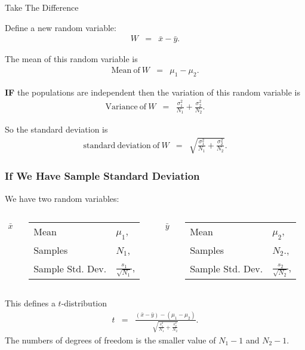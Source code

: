 \begin{frame}{Take The Difference}

  Define a new random variable:
  \begin{eqnarray*}
    W & = & \bar{x} - \bar{y}.
  \end{eqnarray*}

  The mean of this random variable is 
  \begin{eqnarray*}
    \mathrm{Mean~of~}W & = & \mu_1 - \mu_2.
  \end{eqnarray*}

  \textbf{IF} the populations are independent then the variation of
  this random variable is
  \begin{eqnarray*}
    \mathrm{Variance~of~}W & = & \frac{\sigma_1^2}{N_1} + \frac{\sigma_2^2}{N_2}.
  \end{eqnarray*}

  So the standard deviation is
  \begin{eqnarray*}
    \mathrm{standard~deviation~of~}W & = & \sqrt{\frac{\sigma_1^2}{N_1} + \frac{\sigma_2^2}{N_2}}.
  \end{eqnarray*}

  
\end{frame}


\begin{frame}
 \frametitle{If We Have Sample Standard Deviation}

 We have two random variables:

 \begin{columns}
    \begin{eqnarray*}
      \bar{x}
    \end{eqnarray*}
    {
      \begin{tabular}{ll}
        Mean & $\mu_1$, \\
        Samples & $N_1$, \\
        Sample Std. Dev. & $\frac{s_1}{\sqrt{N_1}}$, \\
      \end{tabular}
    }
    \vfill

    \begin{eqnarray*}
      \bar{y}
    \end{eqnarray*}
    {
      \begin{tabular}{ll}
        Mean & $\mu_2$, \\
        Samples & $N_2$., \\
        Sample Std. Dev. & $\frac{s_2}{\sqrt{N_2}}$, \\
      \end{tabular}
    }

 \end{columns}

\vfill

This defines a $t$-distribution
\begin{eqnarray*}
  t & = & \frac{(\bar{x}-\bar{y})-(\mu_1-\mu_2)}{\sqrt{\frac{s_1^2}{N_1} + \frac{s_2^2}{N_2}}}.
\end{eqnarray*}
The numbers of degrees of freedom is the smaller value of $N_1-1$ and $N_2-1$.
 

\end{frame}


